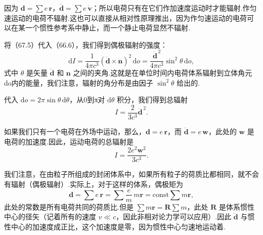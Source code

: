 因为 $\boldsymbol{d}=\sum e\,\boldsymbol{r}$，$\ddot{\boldsymbol{d}}=\sum e\,\dot{\boldsymbol{v}}$；所以电荷只有在它们作加速度运动时才能辐射.作匀速运动的电荷不辐射.这也可以直接从相对性原理推出，因为作匀速运动的电荷可以在某一个惯性参考系中静止，而一个静止电荷显然不辐射.

将（67.5）代入（66.6），我们得到偶极辐射的强度：
\begin{equation}
  \mathrm{d}I=\frac{1}{4\pi c^3}(\ddot{\boldsymbol{d}}\times\boldsymbol{n})^2\,\mathrm{d}o=\frac{\ddot{\boldsymbol{d}}^{\,2}}{4\pi c^3}\sin^2\theta\,\mathrm{d}o,
\end{equation}
式中 $\theta$ 是矢量 $\ddot{\boldsymbol{d}}$ 和 $\boldsymbol{n}$ 之间的夹角.这就是在单位时间内电荷体系辐射到立体角元do内的能量，我们注意，辐射的角分布是由因子 $\sin^2\theta$ 给出的.

代入 $\mathrm{d}o=2\pi\sin\theta\,\mathrm{d}\theta$，从0到π对 $\mathrm{d}\theta$ 积分，我们得到总辐射
\begin{equation}
  I=\frac{2}{3c^3}\ddot{\boldsymbol{d}}^{\,2}.
\end{equation}

如果我们只有一个电荷在外场中运动，那么，$\boldsymbol{d}=e\,\boldsymbol{r}$，而 $\ddot{\boldsymbol{d}}=e\,\boldsymbol{w}$，此处的 $\boldsymbol{w}$ 是电荷的加速度.因此，运动电荷的总辐射是
\begin{equation}
  I=\frac{2e^2\boldsymbol{w}^2}{3c^3}.
\end{equation}

我们注意，在由粒子所组成的封闭体系中，如果所有粒子的荷质比都相同，就不会有辐射（偶极辐射）.实际上，对于这样的体系，偶极矩为
\begin{equation*}
  \boldsymbol{d}=\sum e\,\boldsymbol{r}=\sum\frac{e}{m}\,m\boldsymbol{r}=\mathrm{const}\sum m\boldsymbol{r},
\end{equation*}
此处的常数是所有电荷共同的荷质比.但是 $\sum m\boldsymbol{r}=\boldsymbol{R}\sum m$，此处 $\boldsymbol{R}$ 是体系惯性中心的径矢（记着所有的速度 $v\ll c$，因此非相对论力学可以应用）.因此 $\ddot{\boldsymbol{d}}$ 与惯性中心的加速度成正比，这个加速度是零，因为惯性中心匀速地运动着.

